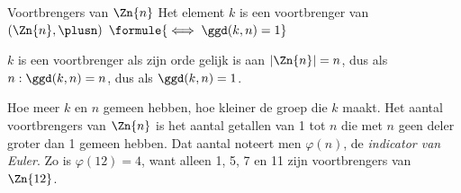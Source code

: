 \begin{theorie}
\begin{stelling}{Voortbrengers van $\Zn{n}$}
Het element $k$ is een voortbrenger van $(\Zn{n}, \plusn)$ \qquad $\formule{\iff \ggd(k, n) = 1}$
\end{stelling}

\begin{bewijs}
$k$ is een voortbrenger als zijn orde gelijk is aan $|\Zn{n}| = n$, dus als $n : \ggd(k, n) = n$, dus als $\ggd(k, n) = 1$.
\end{bewijs}
\end{theorie}

Hoe meer $k$ en $n$ gemeen hebben, hoe kleiner de groep die $k$ maakt. Het aantal voortbrengers van $\Zn{n}$ is het aantal getallen van 1 tot $n$ die met $n$ geen deler groter dan 1 gemeen hebben. Dat aantal noteert men $\varphi(n)$, de \textit{indicator van Euler}. Zo is $\varphi(12) = 4$, want alleen 1, 5, 7 en 11 zijn voortbrengers van $\Zn{12}$.


